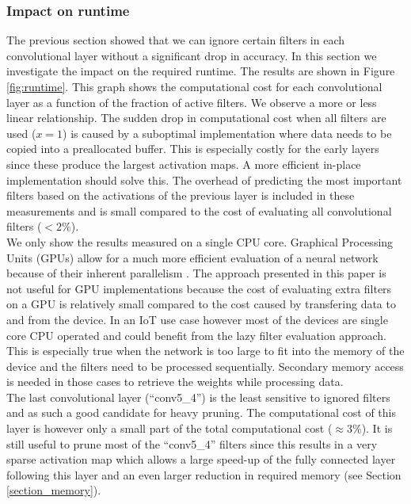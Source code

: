 \documentclass{article}
\begin{document}
\subsubsection{Impact on runtime}
The previous section showed that we can ignore certain filters in each convolutional layer without a significant drop in accuracy. In this section we investigate the impact on the required runtime. The results are shown in Figure \ref{fig:runtime}. This graph shows the computational cost for each convolutional layer as a function of the fraction of active filters. We observe a more or less linear relationship. The sudden drop in computational cost when all filters are used ($x=1$) is caused by a suboptimal implementation where data needs to be copied into a preallocated buffer. This is especially costly for the early layers since these produce the largest activation maps. A more efficient in-place implementation should solve this. The overhead of predicting the most important filters based on the activations of the previous layer is included in these measurements and is small compared to the cost of evaluating all convolutional filters ($<2\%$).
\\
\newline
We only show the results measured on a single CPU core. Graphical Processing Units (GPUs) allow for a much more efficient evaluation of a neural network because of their inherent parallelism \cite{krizhevsky2012imagenet}. The approach presented in this paper is not useful for GPU implementations because the cost of evaluating extra filters on a GPU is relatively small compared to the cost caused by transfering data to and from the device. In an IoT use case however most of the devices are single core CPU operated and could benefit from the lazy filter evaluation approach. This is especially true when the network is too large to fit into the memory of the device and the filters need to be processed sequentially. Secondary memory access is needed in those cases to retrieve the weights while processing data.
\\
\newline
The last convolutional layer (``conv5\_4'') is the least sensitive to ignored filters and as such a good candidate for heavy pruning. The computational cost of this layer is however only a small part of the total computational cost ($\approx 3\%$). It is still useful to prune most of the ``conv5\_4'' filters since this results in a very sparse activation map which allows a large speed-up of the fully connected layer following this layer and an even larger reduction in required memory (see Section \ref{section_memory}). 
\end{document}
